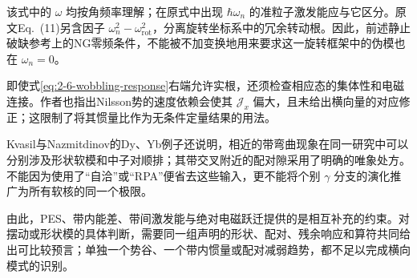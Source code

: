 该式中的 \(\omega\) 均按角频率理解；在原式中出现 \(\hbar\omega_n\) 的准粒子激发能应与它区分。原文Eq.~(11)另含因子 \(\omega_n^2-\omega_{\mathrm{rot}}^2\)，分离旋转坐标系中的冗余转动根。因此，前述静止破缺参考上的NG零频条件，不能被不加变换地用来要求这一旋转框架中的伪模也在 \(\omega_n=0\)。

即使式\eqref{eq:2-6-wobbling-response}右端允许实根，还须检查相应态的集体性和电磁连接。作者也指出Nilsson势的速度依赖会使其 \(\mathcal J_x\) 偏大，且未给出横向量的对应修正；这限制了将其惯量比作为无条件定量结果的用法。\cite[PDF~p.~5, Eq.~(12)后讨论]{matsuzaki-2004-nuclear-inertia-and-wobbling}

Kvasil与Nazmitdinov的Dy、Yb例子还说明，相近的带弯曲现象在同一研究中可以分别涉及形状软模和中子对顺排；其带交叉附近的配对隙采用了明确的唯象处方。不能因为使用了“自洽”或“RPA”便省去这些输入，更不能将个别 \(\gamma\) 分支的演化推广为所有软核的同一个极限。\cite[PDF~pp.~3--4, Eq.~(6), Figs.~2--3]{kvasil-2006-dy156-yb162-crpa-wobbling}

由此，PES、带内能差、带间激发能与绝对电磁跃迁提供的是相互补充的约束。对摆动或形状模的具体判断，需要同一组声明的形状、配对、残余响应和算符共同给出可比较预言；单独一个势谷、一个带内惯量或配对减弱趋势，都不足以完成横向模式的识别。
